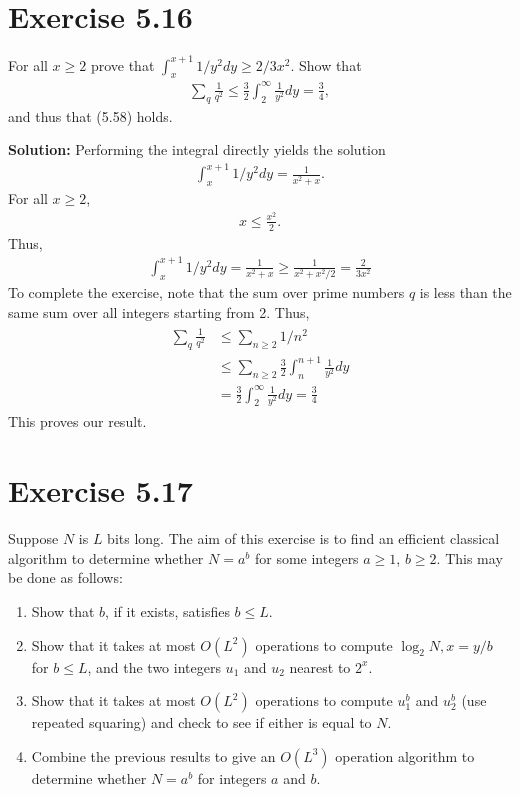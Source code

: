 \documentclass{book}
\begin{document}
\section*{Exercise 5.16}
    For all $x\geq 2$ prove that $\int_x^{x+1} 1/y^2 dy \geq 2/3x^2$. Show that
    \begin{align}
        \sum_q \frac{1}{q^2} \leq \frac{3}{2}\int_2^\infty \frac{1}{y^2} dy =\frac{3}{4},
    \end{align}
    and thus that (5.58) holds.
    
    \textbf{Solution:} Performing the integral directly yields the solution
    \begin{align}
        \int_x^{x+1}1/y^2 dy = \frac{1}{x^2+x}.
    \end{align}
    For all $x\geq 2$,
    \begin{align}
        x \leq \frac{x^2}{2}.
    \end{align}
    Thus,
    \begin{align}
        \int_x^{x+1} 1/y^2 dy = \frac{1}{x^2+x} \geq \frac{1}{x^2 + x^2/2} = \frac{2}{3x^2}
    \end{align}
    To complete the exercise, note that the sum over prime numbers $q$ is less than the same sum over all integers starting from 2. Thus,
    \begin{align}
    \begin{aligned}
        \sum_q \frac{1}{q^2} &\leq \sum_{n\geq 2} 1/n^2 \\
        &\leq \sum_{n\geq 2} \frac{3}{2}\int_{n}^{n+1} \frac{1}{y^2} dy \\
        &= \frac{3}{2} \int_2^{\infty}\frac{1}{y^2} dy = \frac{3}{4}
    \end{aligned}
    \end{align}
    This proves our result.
    
\section*{Exercise 5.17}
    Suppose $N$ is $L$ bits long. The aim of this exercise is to find an efficient classical algorithm to determine whether $N=a^b$ for some integers $a\geq 1$, $b \geq 2$. This may be done as follows:
    \begin{enumerate}
        \item Show that $b$, if it exists, satisfies $b\leq L$.
        \item Show that it takes at most $O(L^2)$ operations to compute $\log_2 N, x = y/b$ for $b \leq L$, and the two integers $u_1$ and $u_2$ nearest to $2^x$.
        \item Show that it takes at most $O(L^2)$ operations to compute $u_1^b$ and $u_2^b$ (use repeated squaring) and check to see if either is equal to $N$.
        \item Combine the previous results to give an $O(L^3)$ operation algorithm to determine whether $N = a^b$ for integers $a$ and $b$.
    \end{enumerate}
\end{document}
